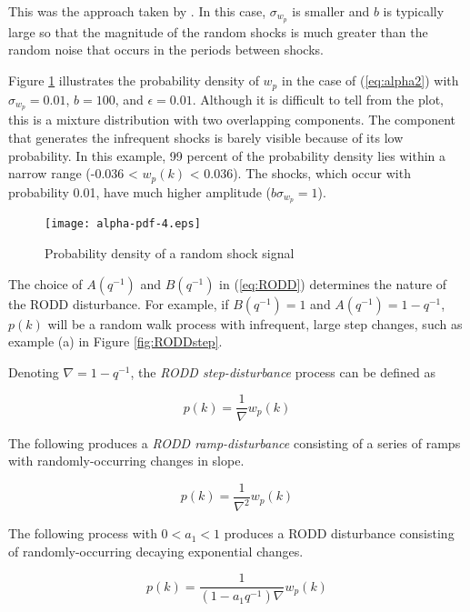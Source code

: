 This was the approach taken by \cite{}. In this case, $\sigma_{w_p}$ is smaller and $b$ is typically large so that the magnitude of the random shocks is much greater than the random noise that occurs in the periods between shocks.

Figure \ref{fig:alpha-pdf} illustrates the probability density of $w_p$ in the case of (\ref{eq:alpha2}) with $\sigma_{w_p}=0.01$, $b=100$, and $\epsilon=0.01$. Although it is difficult to tell from the plot, this is a mixture distribution with two overlapping components. The component that generates the infrequent shocks is barely visible because of its low probability. In this example, 99 percent of the probability density lies within a narrow range (-0.036 < $w_p(k)$ < 0.036). The shocks, which occur with probability 0.01, have much higher amplitude ($b\sigma_{w_p}=1$).

\begin{figure}[htp] \label{fig:alpha-pdf}
	\centering
	\texttt{[image: alpha-pdf-4.eps]}
	\caption{Probability density of a random shock signal}
\end{figure}

The choice of $A(q^{-1})$ and $B(q^{-1})$ in (\ref{eq:RODD}) determines the nature of the RODD disturbance. For example, if $B(q^{-1})=1$ and $A(q^{-1})=1-q^{-1}$, $p(k)$ will be a random walk process with infrequent, large step changes, such as example (a) in Figure \ref{fig:RODDstep}.

\begin{figure}[htp] \label{fig:RODD-examples}
\end{figure}

Denoting $\nabla=1-q^{-1}$, the \textit{RODD step-disturbance} process can be defined as

\begin{equation} \label{eq:RODD-step}
	p(k)= \frac{1}{\nabla}w_p(k)
\end{equation}

The following produces a \textit{RODD ramp-disturbance} consisting of a series of ramps with randomly-occurring changes in slope.

\begin{equation} \label{eq:RODD-ramp}
	p(k)= \frac{1}{\nabla^2}w_p(k)
\end{equation}

The following process with $0<a_1<1$ produces a RODD disturbance consisting of randomly-occurring decaying exponential changes.

\begin{equation} \label{eq:RODD-exp}
	p(k)= \frac{1}{(1-a_1q^{-1})\nabla}w_p(k)
\end{equation}

